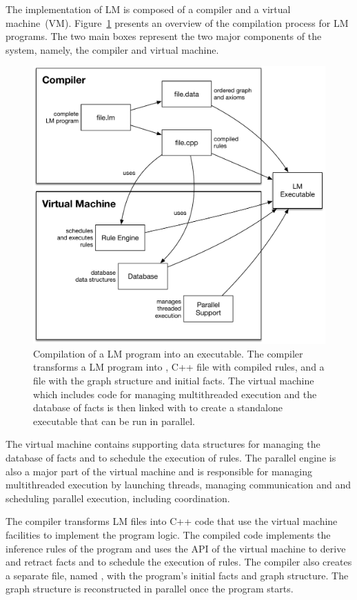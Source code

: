 The implementation of LM is composed of a compiler and a virtual machine~(VM).
Figure~\ref{fig:implementation:overview} presents an overview of the compilation
process for LM programs. The two main boxes represent the two major components
of the system, namely, the compiler and virtual machine.

\begin{figure}[ht]
  \centering
  \includegraphics[width=.75\linewidth]{figures/implementation/overview.pdf}
  \caption{Compilation of a LM program into an executable. The compiler
     transforms a LM program into , C++ file with compiled
     rules, and a  file with the graph structure and initial facts. The virtual
     machine which includes code for managing multithreaded execution and the
     database of facts is then linked with  to create a
     standalone executable that can be run in parallel.}
  \label{fig:implementation:overview}
\end{figure}

The virtual machine contains supporting data structures for managing the
database of facts and to schedule the execution of rules. The parallel engine is
also a major part of the virtual machine and is responsible for managing
multithreaded execution by launching threads, managing communication and
and scheduling parallel execution, including coordination.

The compiler transforms LM files into C++ code that use the virtual machine
facilities to implement the program logic.  The compiled code implements the
inference rules of the program and uses the API of the virtual machine to derive
and retract facts and to schedule the execution of rules.  The compiler also
creates a separate file, named , with the program's initial
facts and graph structure. The graph structure is reconstructed in parallel once
the program starts.

